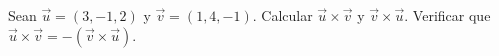 Sean $\vec{u} = (3, -1, 2)$ y $\vec{v} = (1, 4, -1)$. Calcular $\vec{u} \times \vec{v}$ y $\vec{v} \times \vec{u}$. Verificar que $\vec{u} \times \vec{v} = -(\vec{v} \times \vec{u})$.